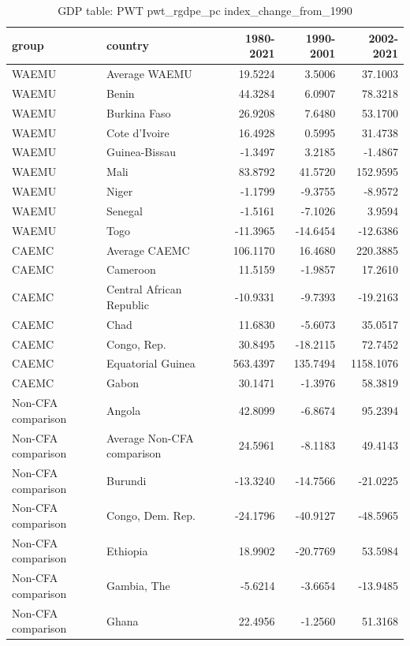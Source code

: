 \begin{table}

\caption{GDP table: PWT pwt_rgdpe_pc index_change_from_1990}
\centering
\begin{tabular}[t]{llrrr}
\toprule
group & country & 1980-2021 & 1990-2001 & 2002-2021\\
\midrule
WAEMU & Average WAEMU & 19.5224 & 3.5006 & 37.1003\\
WAEMU & Benin & 44.3284 & 6.0907 & 78.3218\\
WAEMU & Burkina Faso & 26.9208 & 7.6480 & 53.1700\\
WAEMU & Cote d'Ivoire & 16.4928 & 0.5995 & 31.4738\\
WAEMU & Guinea-Bissau & -1.3497 & 3.2185 & -1.4867\\
\addlinespace
WAEMU & Mali & 83.8792 & 41.5720 & 152.9595\\
WAEMU & Niger & -1.1799 & -9.3755 & -8.9572\\
WAEMU & Senegal & -1.5161 & -7.1026 & 3.9594\\
WAEMU & Togo & -11.3965 & -14.6454 & -12.6386\\
CAEMC & Average CAEMC & 106.1170 & 16.4680 & 220.3885\\
\addlinespace
CAEMC & Cameroon & 11.5159 & -1.9857 & 17.2610\\
CAEMC & Central African Republic & -10.9331 & -9.7393 & -19.2163\\
CAEMC & Chad & 11.6830 & -5.6073 & 35.0517\\
CAEMC & Congo, Rep. & 30.8495 & -18.2115 & 72.7452\\
CAEMC & Equatorial Guinea & 563.4397 & 135.7494 & 1158.1076\\
\addlinespace
CAEMC & Gabon & 30.1471 & -1.3976 & 58.3819\\
Non-CFA comparison & Angola & 42.8099 & -6.8674 & 95.2394\\
Non-CFA comparison & Average Non-CFA comparison & 24.5961 & -8.1183 & 49.4143\\
Non-CFA comparison & Burundi & -13.3240 & -14.7566 & -21.0225\\
Non-CFA comparison & Congo, Dem. Rep. & -24.1796 & -40.9127 & -48.5965\\
\addlinespace
Non-CFA comparison & Ethiopia & 18.9902 & -20.7769 & 53.5984\\
Non-CFA comparison & Gambia, The & -5.6214 & -3.6654 & -13.9485\\
Non-CFA comparison & Ghana & 22.4956 & -1.2560 & 51.3168\\

\end{tabular}
\end{table}
